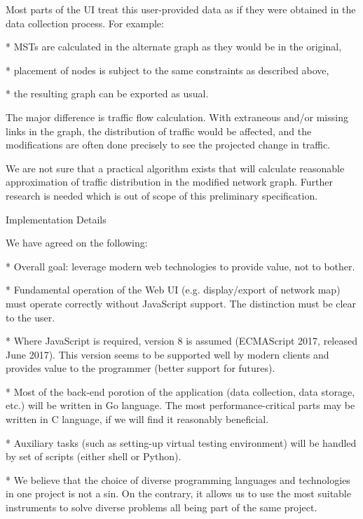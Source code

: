 Most parts of the UI treat this user-provided data as if they were obtained in
the data collection process. For example:

\begitems

* MSTs are calculated in the alternate graph as they would be in the original,

* placement of nodes is subject to the same constraints as described above,

* the resulting graph can be exported as usual.

\enditems

The major difference is traffic flow calculation. With extraneous and/or
missing links in the graph, the distribution of traffic would be affected, and
the modifications are often done precisely to see the projected change in
traffic.

We are not sure that a practical algorithm exists that will calculate reasonable
approximation of traffic distribution in the modified network graph. Further
research is needed which is out of scope of this preliminary specification.

\secc Implementation Details

We have agreed on the following:

\begitems

* Overall goal: leverage modern web technologies to provide value, not to bother.

* Fundamental operation of the Web UI (e.g. display/export of network map) must
operate correctly without JavaScript support. The distinction must be clear to
the user.

* Where JavaScript is required, version 8 is assumed (ECMAScript 2017, released
June 2017). This version seems to be supported well by modern clients and
provides value to the programmer (better support for futures).

* Most of the back-end porotion of the application (data collection, data
storage, etc.) will be written in Go language. The most performance-critical
parts may be written in C language, if we will find it reasonably beneficial.

* Auxiliary tasks (such as setting-up virtual testing environment) will be
handled by set of scripts (either shell or Python).

* We believe that the choice of diverse programming languages and technologies
in one project is not a sin. On the contrary, it allows us to use the most
suitable instruments to solve diverse problems all being part of the same
project.

\enditems

\bye
